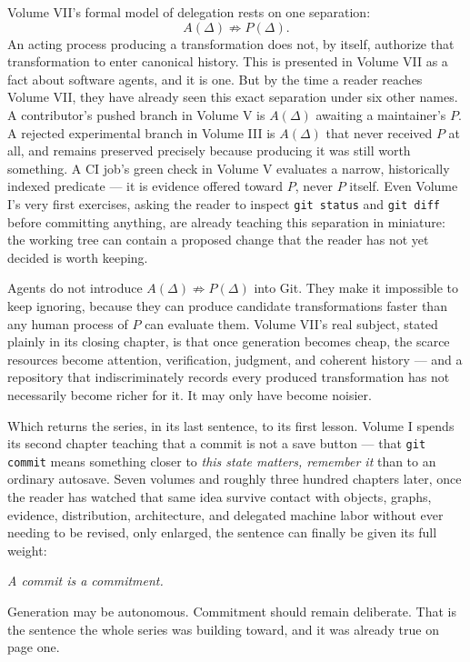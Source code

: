 \documentclass[11pt]{book}
\begin{document}
Volume VII's formal model of delegation rests on one separation:
\[
A(\Delta) \not\Rightarrow P(\Delta).
\]
An acting process producing a transformation does not, by itself, authorize that transformation to enter canonical history. This is presented in Volume VII as a fact about software agents, and it is one. But by the time a reader reaches Volume VII, they have already seen this exact separation under six other names. A contributor's pushed branch in Volume V is $A(\Delta)$ awaiting a maintainer's $P$. A rejected experimental branch in Volume III is $A(\Delta)$ that never received $P$ at all, and remains preserved precisely because producing it was still worth something. A CI job's green check in Volume V evaluates a narrow, historically indexed predicate — it is evidence offered toward $P$, never $P$ itself. Even Volume I's very first exercises, asking the reader to inspect \texttt{git status} and \texttt{git diff} before committing anything, are already teaching this separation in miniature: the working tree can contain a proposed change that the reader has not yet decided is worth keeping.

Agents do not introduce $A(\Delta) \not\Rightarrow P(\Delta)$ into Git. They make it impossible to keep ignoring, because they can produce candidate transformations faster than any human process of $P$ can evaluate them. Volume VII's real subject, stated plainly in its closing chapter, is that once generation becomes cheap, the scarce resources become attention, verification, judgment, and coherent history — and a repository that indiscriminately records every produced transformation has not necessarily become richer for it. It may only have become noisier.

Which returns the series, in its last sentence, to its first lesson. Volume I spends its second chapter teaching that a commit is not a save button — that \texttt{git commit} means something closer to \emph{this state matters, remember it} than to an ordinary autosave. Seven volumes and roughly three hundred chapters later, once the reader has watched that same idea survive contact with objects, graphs, evidence, distribution, architecture, and delegated machine labor without ever needing to be revised, only enlarged, the sentence can finally be given its full weight:

\begin{center}
\Large\itshape A commit is a commitment.
\end{center}

Generation may be autonomous. Commitment should remain deliberate. That is the sentence the whole series was building toward, and it was already true on page one.
\end{document}
